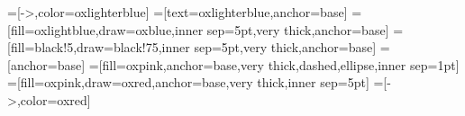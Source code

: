 =[->,color=oxlighterblue]
=[text=oxlighterblue,anchor=base]
=[fill=oxlightblue,draw=oxblue,inner sep=5pt,very
      thick,anchor=base]
=[fill=black!5,draw=black!75,inner sep=5pt,very
      thick,anchor=base]
      =[anchor=base]
      =[fill=oxpink,anchor=base,very
  thick,dashed,ellipse,inner sep=1pt]
  =[fill=oxpink,draw=oxred,anchor=base,very
  thick,inner sep=5pt]
  =[->,color=oxred]

  


\newtheorem{proposition}[theorem]{Proposition}